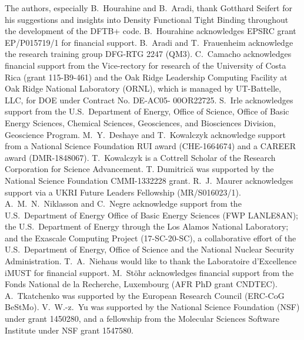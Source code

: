 \documentclass[reprint,onecolumn,superscriptaddress]{revtex4-1}
\newcommand{\dftbp}{DFTB+}
\begin{document}
\begin{acknowledgments}
  The authors, especially B.~Hourahine and B.~Aradi, thank Gotthard Seifert for
  his suggestions and insights into Density Functional Tight Binding throughout
  the development of the \dftbp{} code. B.~Hourahine acknowledges EPSRC grant
  EP/P015719/1 for financial support. B.~Aradi and T.~Frauenheim acknowledge the
  research training group DFG-RTG 2247 (QM3). C.~Camacho acknowledges financial
  support from the Vice-rectory for research of the University of Costa Rica
  (grant 115-B9-461) and the Oak Ridge Leadership Computing Facility at Oak
  Ridge National Laboratory (ORNL), which is managed by UT-Battelle, LLC, for
  DOE under Contract No. DE-AC05- 00OR22725.  S.~Irle acknowledges support from
  the U.S.\ Department of Energy, Office of Science, Office of Basic Energy
  Sciences, Chemical Sciences, Geosciences, and Biosciences Division, Geoscience
  Program.  M.~Y.~Deshaye and T.~Kowalczyk acknowledge support from a National
  Science Foundation RUI award (CHE-1664674) and a CAREER award
  (DMR-1848067). T.~Kowalczyk is a Cottrell Scholar of the Research Corporation
  for Science Advancement.  T. Dumitric\u{a} was supported by the National
  Science Foundation CMMI-1332228 grant.  R.~J.~Maurer acknowledges support via
  a UKRI Future Leaders Fellowship (MR/S016023/1). A.~M.~N.~Niklasson and
  C.~Negre acknowledge support from the U.S.\ Department of Energy Office of
  Basic Energy Sciences (FWP LANLE8AN); the U.S.\ Department of Energy through
  the Los Alamos National Laboratory; and the Exascale Computing Project
  (17-SC-20-SC), a collaborative effort of the U.S.\ Department of Energy,
  Office of Science and the National Nuclear Security
  Administration. T.~A.~Niehaus would like to thank the Laboratoire d'Excellence
  iMUST for financial support. M.~St\"{o}hr acknowledges financial support from
  the Fonds National de la Recherche, Luxembourg (AFR PhD grant CNDTEC).
  A.~Tkatchenko was supported by the European Research Council (ERC-CoG BeStMo).
  V.~W.-z.~Yu was supported by the National Science Foundation (NSF) under grant
  1450280, and a fellowship from the Molecular Sciences Software Institute under
  NSF grant 1547580.
\end{acknowledgments}

\raggedright


\end{document}
